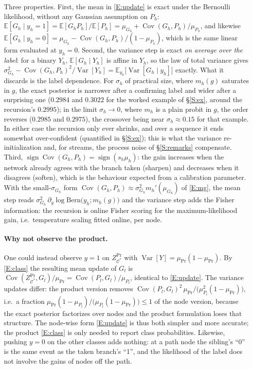 \documentclass[letterpaper]{article}
\begin{document}
Three properties. First, the mean in \eqref{E:update} is exact under the Bernoulli likelihood, without any Gaussian assumption on $P_h$: $\mathbb E[G_h\mid y_h=1]=\mathbb E[G_hP_h]/\mathbb E[P_h]=\mu_{G_h}+\operatorname{Cov}(G_h,P_h)/\mu_{P_h}$, and likewise $\mathbb E[G_h\mid y_h=0]=\mu_{G_h}-\operatorname{Cov}(G_h,P_h)/(1-\mu_{P_h})$, which is the same linear form evaluated at $y_h=0$. Second, the variance step is exact \emph{on average over the label}: for a binary $Y_h$, $\mathbb E[G_h\mid Y_h]$ is affine in $Y_h$, so the law of total variance gives $\sigma^2_{G_h}-\operatorname{Cov}(G_h,P_h)^2/\operatorname{Var}[Y_h]=\mathbb E_{y_h}\big[\operatorname{Var}[G_h\mid y_h]\big]$ exactly. What it discards is the label dependence. For $\sigma_h$ of practical size, where $m_h(g)$ saturates in $g$, the exact posterior is narrower after a confirming label and wider after a surprising one ($0.2984$ and $0.3022$ for the worked example of \S\ref{S:ex}, around the recursion's $0.2995$); in the limit $\sigma_h\to0$, where $m_h$ is a plain probit in $g$, the order reverses ($0.2985$ and $0.2975$), the crossover being near $\sigma_h\approx0.15$ for that example. In either case the recursion only ever shrinks, and over a sequence it ends somewhat over-confident (quantified in \S\ref{S:ex}); this is what the variance re-initialization and, for streams, the process noise of \S\ref{S:remarks} compensate. Third, $\operatorname{sign}\operatorname{Cov}(G_h,P_h)=\operatorname{sign}(s_h\mu_h)$: the gain increases when the network already agrees with the branch taken (sharpen) and decreases when it disagrees (soften), which is the behaviour expected from a calibration parameter. With the small-$\sigma_{G_h}$ form $\operatorname{Cov}(G_h,P_h)\approx\sigma^2_{G_h}m_h'(\mu_{G_h})$ of \eqref{E:mg}, the mean step reads $\sigma^2_{G_h}\,\partial_g\log\mathrm{Bern}\big(y_h;m_h(g)\big)$ and the variance step adds the Fisher information: the recursion is online Fisher scoring for the maximum-likelihood gain, i.e.\ temperature scaling fitted online, per node.

\paragraph{Why not observe the product.} One could instead observe $y=1$ on $Z^{\Pr}_{\mathcal C^\ast}$ with $\operatorname{Var}[Y]=\mu_{\Pr}(1-\mu_{\Pr})$. By \eqref{E:class} the resulting mean update of $G_l$ is $\operatorname{Cov}(Z^{\Pr}_{\mathcal C^\ast},G_l)/\mu_{\Pr}=\operatorname{Cov}(P_l,G_l)/\mu_{P_l}$, identical to \eqref{E:update}. The variance updates differ: the product version removes $\operatorname{Cov}(P_l,G_l)^2\,\mu_{\Pr}/\big(\mu_{P_l}^2(1-\mu_{\Pr})\big)$, i.e.\ a fraction $\mu_{\Pr}(1-\mu_{P_l})/\big(\mu_{P_l}(1-\mu_{\Pr})\big)\le1$ of the node version, because the exact posterior factorizes over nodes and the product formulation loses that structure. The node-wise form \eqref{E:update} is thus both simpler and more accurate; the product \eqref{E:class} is only needed to report class probabilities. Likewise, pushing $y=0$ on the other classes adds nothing: at a path node the sibling's ``0'' is the same event as the taken branch's ``1'', and the likelihood of the label does not involve the gains of nodes off the path.
\end{document}
